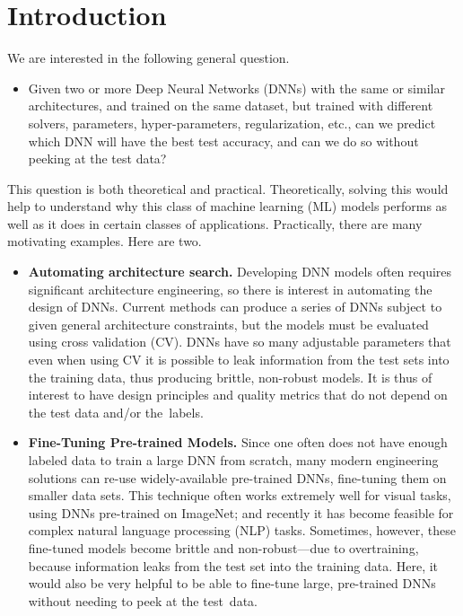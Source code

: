 \vspace{-3mm}

\section{Introduction}
\label{sxn:intro}

\vspace{-2mm}

We are interested in the following general question.
\vspace{-2mm}
\begin{itemize}
\item
Given two or more Deep Neural Networks (DNNs) with the same or similar architectures, and trained on the same dataset, but trained with different solvers, parameters, hyper-parameters, regularization, etc., can we predict which DNN will have the best test accuracy, and can we do so without peeking at the test data? 
\end{itemize}
\vspace{-1mm}

This question is both theoretical and practical. 
Theoretically, solving this would help to understand why this class of machine learning (ML) models performs as well as it does in certain classes of applications.
Practically, there are many motivating examples.
% 
Here are two.
\vspace{-2mm}
\begin{itemize}
\item
\textbf{Automating architecture search.}
Developing DNN models often requires significant architecture engineering, so there is interest in automating the design of DNNs.
Current methods can produce a series of DNNs subject to given general architecture constraints, but the models must be evaluated using cross validation (CV).
DNNs have so many adjustable parameters that even when using CV it is possible to leak information from the test sets into the training data, thus producing brittle, non-robust models.
It is thus of interest to have design principles and quality metrics that do not depend on the test data and/or the~labels. 
\item
\textbf{Fine-Tuning Pre-trained Models.}
Since one often does not have enough labeled data to train a large DNN from scratch, many modern engineering solutions can re-use widely-available pre-trained DNNs, fine-tuning them on smaller data sets. 
This technique often works extremely well for visual tasks, using DNNs pre-trained on ImageNet; and recently it has become feasible for complex natural language processing (NLP) tasks. 
Sometimes, however, these fine-tuned models become brittle and non-robust---due to overtraining, because information leaks from the test set into the training data.
Here, it would also be very helpful to be able to fine-tune large, pre-trained DNNs without needing to peek at the test~data.
\end{itemize}
\vspace{-1mm}

